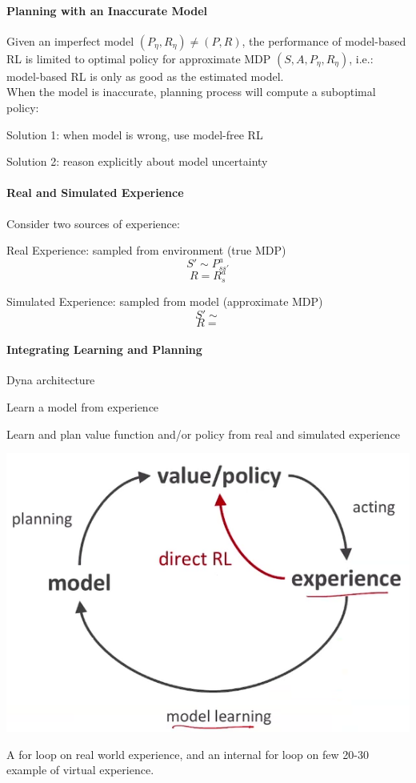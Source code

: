 \documentclass[10pt]{report}
\begin{document}
\paragraph{Planning with an Inaccurate Model} Given an imperfect model $(P_\eta, R_\eta)\neq (P,R)$, the performance of model-based RL is limited to optimal policy for approximate MDP $(S,A,P_\eta,R_\eta)$, i.e.: model-based RL is only as good as the estimated model.\\
When the model is inaccurate, planning process will compute a suboptimal policy:
\begin{list}{}{}
	\item Solution 1: when model is wrong, use model-free RL
	\item Solution 2: reason explicitly about model uncertainty
\end{list}
\paragraph{Real and Simulated Experience} Consider two sources of experience:
\begin{list}{}{}
	\item Real Experience: sampled from environment (true MDP)
	$$S'\sim P_{ss'}^a$$
	$$R = R_s^a$$
	\item Simulated Experience: sampled from model (approximate MDP)
	$$S'\sim$$ %
	$$R = $$
\end{list}
\paragraph{Integrating Learning and Planning} %
Dyna architecture
\begin{list}{}{}
	\item Learn a model from experience
	\item Learn and plan value function and/or policy from real and simulated experience
\end{list}
\begin{center}
	\includegraphics[scale=0.5]{185.png}
\end{center}
A for loop on real world experience, and an internal for loop on few 20-30 example of virtual experience.
\end{document}
